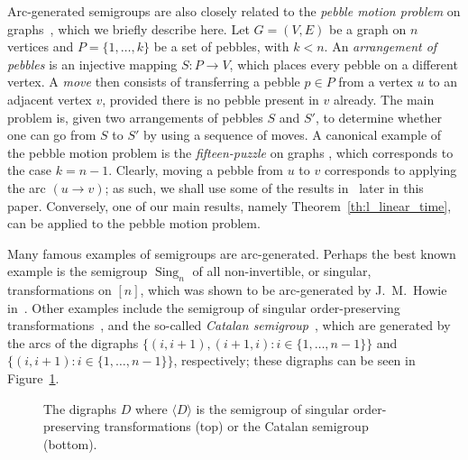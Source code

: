 \documentclass[ALCO,ThmDefs,Unicode,epreuves]{cedram}
\DeclareMathOperator{\Sing}{Sing}
\newcommand{\genset}[1]{\langle#1\rangle}
\newcommand{\set}[2]{\{#1:#2\}}
\newcommand{\nset}{[n]}
\begin{document}
Arc-generated semigroups are also closely related to the \emph{pebble motion
problem} on graphs~\cite{Kornhauser1984aa}, which we briefly describe here. Let $G =
(V,E)$ be a graph on $n$ vertices and $P = \{1, \dots, k\}$ be a set of
pebbles, with $k < n$. An \emph{arrangement of pebbles} is an injective
mapping $S : P \to V$, which places every pebble on a different vertex. A
\emph{move} then consists of transferring a pebble $p \in P$ from a vertex
$u$ to an adjacent vertex $v$, provided there is no pebble present in $v$
already. The main problem is, given two arrangements of pebbles $S$ and $S'$,
to determine whether one can go from $S$ to $S'$ by using a sequence of moves.
A canonical example of the pebble motion problem is the \emph{fifteen-puzzle}
on graphs \cite{Wilson1974aa}, which corresponds to the case $k = n-1$. Clearly, moving
a pebble from $u$ to $v$ corresponds to applying the arc $(u \to v)$; as such,
we shall use some of the results in~\cite{Wilson1974aa} later in this paper. Conversely,
one of our main results, namely Theorem~\ref{th:l_linear_time}, can be applied
to the pebble motion problem. 


Many famous examples of semigroups are arc-generated. Perhaps the best known
example is the semigroup $\Sing_n$ of all non-invertible, or singular,
transformations on $\nset$, which was shown to be arc-generated by J.~M.~Howie
in~\cite{Howie1966aa}. Other examples include the semigroup of singular
order-preserving transformations~\cite{Aizenshtat1962aa}, and the so-called
\emph{Catalan semigroup}~\cite{Higgins1993aa, Solomon1996aa}, which are generated by the arcs of 
the digraphs $\set{(i, i + 1), (i + 1, i)}{i\in\{1, \ldots, n -1\}}$ 
and $\set{(i, i + 1)}{i\in\{1, \ldots, n -1\}}$, respectively;
these digraphs can be seen in Figure~\ref{fig-catalan}.

\begin{figure}[htb]\centering

\vspace*{2mm}
 \caption{The digraphs $D$ where $\genset{D}$ is the semigroup of singular 
 order-preserving transformations (top) or the Catalan semigroup (bottom).}
 \label{fig-catalan}
\end{figure}
\end{document}
